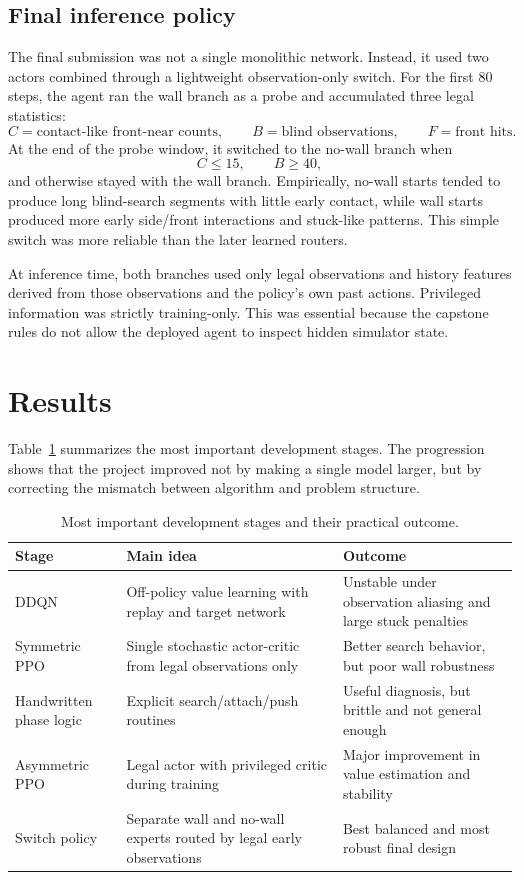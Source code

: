 \documentclass[11pt, oneside]{article}   	%
\begin{document}
\subsection{Final inference policy}

The final submission was not a single monolithic network. Instead, it used two actors combined through a lightweight observation-only switch. For the first 80 steps, the agent ran the wall branch as a probe and accumulated three legal statistics:
\[
C=\text{contact-like front-near counts}, \qquad
B=\text{blind observations}, \qquad
F=\text{front hits}.
\]
At the end of the probe window, it switched to the no-wall branch when
\[
C\le 15,\qquad B\ge 40,
\]
and otherwise stayed with the wall branch. Empirically, no-wall starts tended to produce long blind-search segments with little early contact, while wall starts produced more early side/front interactions and stuck-like patterns. This simple switch was more reliable than the later learned routers.

At inference time, both branches used only legal observations and history features derived from those observations and the policy's own past actions. Privileged information was strictly training-only. This was essential because the capstone rules do not allow the deployed agent to inspect hidden simulator state.

\section{Results}

Table~\ref{tab:devsummary} summarizes the most important development stages. The progression shows that the project improved not by making a single model larger, but by correcting the mismatch between algorithm and problem structure.

\begin{table}[H]
\centering
\small
\begin{tabular}{p{}p{}p{}}
\toprule
Stage & Main idea & Outcome \\
\midrule
DDQN & Off-policy value learning with replay and target network & Unstable under observation aliasing and large stuck penalties \\
Symmetric PPO & Single stochastic actor-critic from legal observations only & Better search behavior, but poor wall robustness \\
Handwritten phase logic & Explicit search/attach/push routines & Useful diagnosis, but brittle and not general enough \\
Asymmetric PPO & Legal actor with privileged critic during training & Major improvement in value estimation and stability \\
Switch policy & Separate wall and no-wall experts routed by legal early observations & Best balanced and most robust final design \\
\bottomrule
\end{tabular}
\caption{Most important development stages and their practical outcome.}
\label{tab:devsummary}
\end{table}
\end{document}
